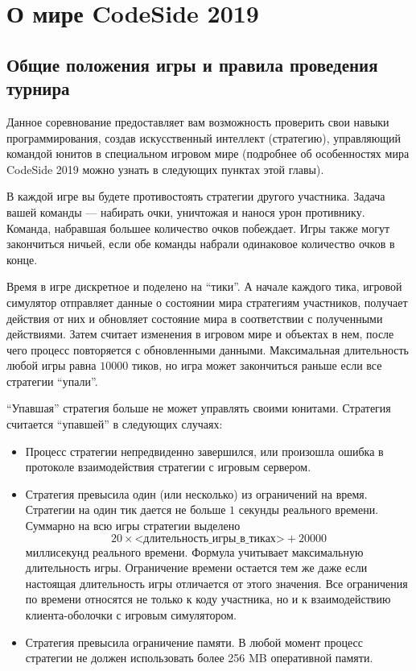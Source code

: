 \chapter{О мире CodeSide 2019}

\section{Общие положения игры и правила проведения турнира}

Данное соревнование предоставляет вам возможность проверить свои навыки программирования,
создав искусственный интеллект (стратегию),
управляющий командой юнитов в специальном игровом мире
(подробнее об особенностях мира CodeSide 2019 можно узнать в следующих пунктах этой главы).

В каждой игре вы будете противостоять стратегии другого участника.
Задача вашей команды --- набирать очки, уничтожая и нанося урон противнику.
Команда, набравшая большее количество очков побеждает.
Игры также могут закончиться ничьей, если обе команды набрали одинаковое количество очков в конце.

Время в игре дискретное и поделено на ``тики''.
А начале каждого тика, игровой симулятор отправляет данные о состоянии мира стратегиям участников,
получает действия от них и обновляет состояние мира в соответствии с полученными действиями.
Затем считает изменения в игровом мире и объектах в нем, после чего процесс повторяется с обновленными данными.
Максимальная длительность любой игры равна $10000$ тиков, но игра может закончиться раньше если все стратегии ``упали''.

``Упавшая'' стратегия больше не может управлять своими юнитами. Стратегия считается ``упавшей'' в следующих случаях:
\begin{itemize}
\item Процесс стратегии непредвиденно завершился,
      или произошла ошибка в протоколе взаимодействия стратегии с игровым сервером.
\item Стратегия превысила один (или несколько) из ограничений на время.
      Стратегии на один тик дается не больше $1$ секунды реального времени.
      Суммарно на всю игры стратегии выделено
      \begin{equation}
      20\times\textit{<длительность\_игры\_в\_тиках>}+20000
      \end{equation}
      миллисекунд реального времени.
      Формула учитывает максимальную длительность игры. Ограничение времени остается тем же даже если
      настоящая длительность игры отличается от этого значения. Все ограничения по времени относятся не только к коду участника,
      но и к взаимодействию клиента-оболочки с игровым симулятором.
\item Стратегия превысила ограничение памяти. В любой момент процесс стратегии не должен использовать более 256 MB оперативной памяти.
\end{itemize}

